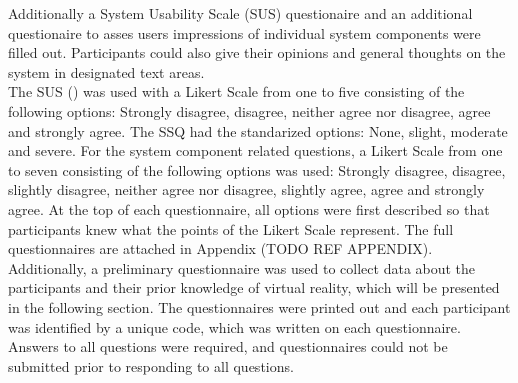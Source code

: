 Additionally a System Usability Scale (SUS) \cite{brooke1996sus} questionaire and an additional questionaire to asses users impressions of individual system components were filled out.
Participants could also give their opinions and general thoughts on the system in designated text areas.
\\ The SUS (\cite{brooke1996sus}) was used with a Likert Scale from one to five consisting of the following options: Strongly disagree, disagree, neither agree nor disagree, agree and strongly agree.
The SSQ had the standarized options: None, slight, moderate and severe.
For the system component related questions, a Likert Scale from one to seven consisting of the following options was used: Strongly disagree, disagree, slightly disagree, neither agree nor disagree, slightly agree, agree and strongly agree.
At the top of each questionnaire, all options were first described so that participants knew what the points of the Likert Scale represent.
The full questionnaires are attached in Appendix (TODO REF APPENDIX).
Additionally, a preliminary questionnaire was used to collect data about the participants and their prior knowledge of virtual reality, which will be presented in the following section.
The questionnaires were printed out and each participant was identified by a unique code, which was written on each questionnaire.
Answers to all questions were required, and questionnaires could not be submitted prior to responding to all questions.